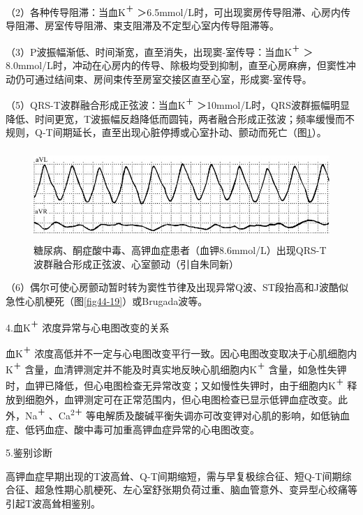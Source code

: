 （2）各种传导阻滞：当血K\textsuperscript{＋}
＞6.5mmol/L时，可出现窦房传导阻滞、心房内传导阻滞、房室传导阻滞、束支阻滞及不定型心室内传导阻滞等。

（3）P波振幅渐低、时间渐宽，直至消失，出现窦-室传导：当血K\textsuperscript{＋}
＞8.0mmol/L时，冲动在心房内的传导、除极均受到抑制，直至心房麻痹，但窦性冲动仍可通过结间束、房间束传至房室交接区直至心室，形成窦-室传导。

（5）QRS-T波群融合形成正弦波：当血K\textsuperscript{＋}
＞10mmol/L时，QRS波群振幅明显降低、时间更宽，T波振幅反趋降低而圆钝，两者融合形成正弦波；频率缓慢而不规则，Q-T间期延长，直至出现心脏停搏或心室扑动、颤动而死亡（图\ref{fig45-5}）。

\begin{figure}[!htbp]
 \centering
 \includegraphics[width=5.1875in,height=1.36458in]{./images/Image00733.jpg}
 \captionsetup{justification=centering}
 \caption{糖尿病、酮症酸中毒、高钾血症患者（血钾8.6mmol/L）出现QRS-T波群融合形成正弦波、心室颤动（引自朱同新）}
 \label{fig45-5}
  \end{figure} 

（6）偶尔可使心房颤动暂时转为窦性节律及出现异常Q波、ST段抬高和J波酷似急性心肌梗死（图\ref{fig44-19}）或Brugada波等。

4.血K\textsuperscript{＋} 浓度异常与心电图改变的关系

血K\textsuperscript{＋}
浓度高低并不一定与心电图改变平行一致。因心电图改变取决于心肌细胞内K\textsuperscript{＋}
含量，血清钾测定并不能及时真实地反映心肌细胞内K\textsuperscript{＋}
含量，如急性失钾时，血钾已降低，但心电图检查无异常改变；又如慢性失钾时，由于细胞内K\textsuperscript{＋}
释放到细胞外，血钾测定可在正常范围内，但心电图检查已显示低钾血症改变。此外，Na\textsuperscript{＋}
、Ca\textsuperscript{2＋}
等电解质及酸碱平衡失调亦可改变钾对心肌的影响，如低钠血症、低钙血症、酸中毒可加重高钾血症异常的心电图改变。

5.鉴别诊断

高钾血症早期出现的T波高耸、Q-T间期缩短，需与早复极综合征、短Q-T间期综合征、超急性期心肌梗死、左心室舒张期负荷过重、脑血管意外、变异型心绞痛等引起T波高耸相鉴别。

\protect\hypertarget{text00053.htmlux5cux23subid639}{}{}

